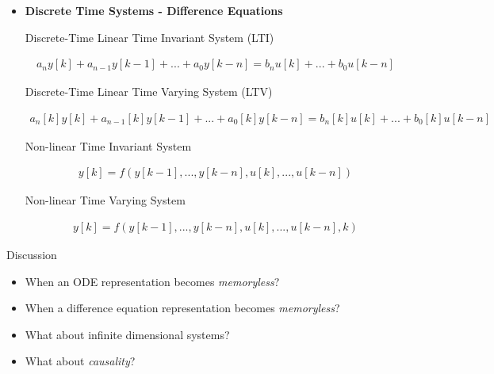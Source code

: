 \documentclass[12pt,oneside]{amsart}
\begin{document}
\begin{itemize}
\item \textbf{Discrete Time Systems - Difference Equations}

\vspace{12pt}

Discrete-Time Linear Time Invariant System (LTI)

\begin{align*}
a_n  y[k] + a_{n-1}  y[k-1] + ... + a_0 y[k-n] = b_{n}  u[k] + ... + b_0 u[k-n]
\end{align*}

\vspace{12pt}

Discrete-Time Linear Time Varying System (LTV)

\begin{align*}
a_n[k]  y[k] + a_{n-1}[k] y[k-1] + ... + a_0[k] y[k-n] = b_{n}[k]  u[k] + ... + b_0[k] u[k-n]
\end{align*}

\vspace{12pt}

Non-linear Time Invariant System

\begin{align*}
y[k] = f(y[k-1], ..., y[k-n], u[k],  ... , u[k-n])
\end{align*}

\vspace{12pt}

Non-linear Time Varying System

\begin{align*}
y[k] = f(y[k-1], ..., y[k-n], u[k],  ... , u[k-n],k)
\end{align*}

\vspace{12pt}

\end{itemize}

\vspace{12pt}

Discussion 

\vspace{6pt}

\begin{itemize}
  \item When an ODE representation becomes \textit{memoryless}?
  \item When a difference equation representation becomes \textit{memoryless}?
  \item What about infinite dimensional systems?
  \item What about \textit{causality}?    
\end{itemize}
\end{document}
